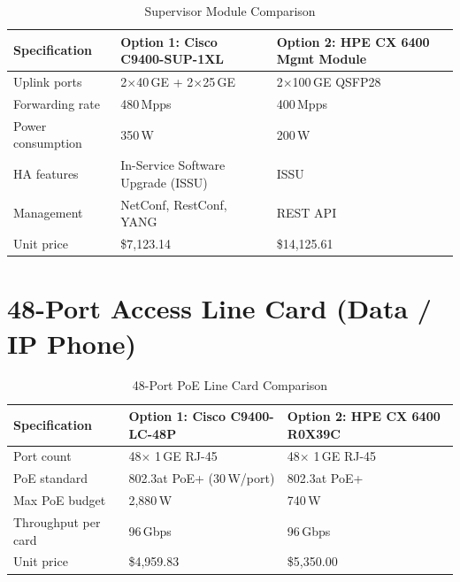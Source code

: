 \documentclass[12pt,a4paper]{report}
\begin{document}
\begin{table}[H]
  \centering
  \caption{Supervisor Module Comparison}
  \label{tab:sup_compare}
  \begin{tabular}{L{3.8cm} L{5.2cm} L{5.2cm}}
    \toprule
    \textbf{Specification} & \textbf{Option 1: Cisco C9400-SUP-1XL} & \textbf{Option 2: HPE CX 6400 Mgmt Module} \\
    \midrule
    Uplink ports           & 2$\times$40\,GE + 2$\times$25\,GE      & 2$\times$100\,GE QSFP28 \\
    Forwarding rate        & 480\,Mpps                                & 400\,Mpps \\
    Power consumption      & 350\,W                                   & 200\,W \\
    HA features            & In-Service Software Upgrade (ISSU)       & ISSU \\
    Management             & NetConf, RestConf, YANG                  & REST API \\
    Unit price       & \$7{,}123.14                             & \$14{,}125.61 \\
    \bottomrule
  \end{tabular}
\end{table}

\section{48-Port Access Line Card (Data / IP Phone)}

\begin{table}[H]
  \centering
  \caption{48-Port PoE Line Card Comparison}
  \label{tab:lc48_compare}
  \begin{tabular}{L{3.8cm} L{5.2cm} L{5.2cm}}
    \toprule
    \textbf{Specification} & \textbf{Option 1: Cisco C9400-LC-48P} & \textbf{Option 2: HPE CX 6400 R0X39C} \\
    \midrule
    Port count             & 48$\times$ 1\,GE RJ-45            & 48$\times$ 1\,GE RJ-45 \\
    PoE standard           & 802.3at PoE+ (30\,W/port)         & 802.3at PoE+ \\
    Max PoE budget         & 2{,}880\,W                         & 740\,W \\
    Throughput per card    & 96\,Gbps                           & 96\,Gbps \\
    Unit price       & \$4{,}959.83                       & \$5{,}350.00 \\
    \bottomrule
  \end{tabular}
\end{table}
\end{document}
